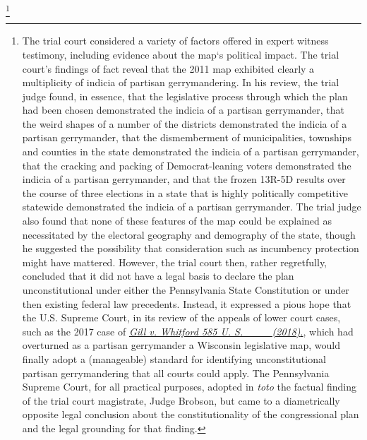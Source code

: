         \footnote{The trial court considered a variety of factors offered in expert witness testimony, including evidence about the map‘s political impact. The trial court’s findings of fact reveal that the 2011 map exhibited clearly a multiplicity of indicia of partisan gerrymandering. In his review, the trial judge found, in essence, that the legislative process through which the plan had been chosen demonstrated the indicia of a partisan gerrymander, that the weird shapes of a number of the districts demonstrated the indicia of a partisan gerrymander, that the dismemberment of municipalities, townships and counties in the state demonstrated the indicia of a partisan gerrymander, that the cracking and packing of Democrat-leaning voters demonstrated the indicia of a partisan gerrymander, and that the frozen 13R-5D results over the course of three elections in a state that is highly politically competitive statewide demonstrated the indicia of a partisan gerrymander. The trial judge also found that none of these features of the map could be explained as necessitated by the electoral geography and demography of the state, though he suggested the possibility that consideration such as incumbency protection might have mattered. However, the trial court then, rather regretfully, concluded that it did not have a legal basis to declare the plan unconstitutional under either the Pennsylvania State Constitution or under then existing federal law precedents. Instead, it expressed a pious hope that the U.S. Supreme Court, in its review of the appeals of lower court cases, such as the 2017 case of \href{https://www.brennancenter.org/sites/default/files/legal-work/16-1161_Opinion.pdf}{\textit{Gill v. Whitford 585 U. S. \_\_\_ (2018)}.}, which had overturned as a partisan gerrymander a Wisconsin legislative map, would finally adopt a (manageable) standard for identifying unconstitutional partisan gerrymandering that all courts could apply. The Pennsylvania Supreme Court, for all practical purposes, adopted in \textit{toto} the factual finding of the trial court magistrate, Judge Brobson, but came to a diametrically opposite legal conclusion about the constitutionality of the congressional plan and the legal grounding for that finding.}
\par
